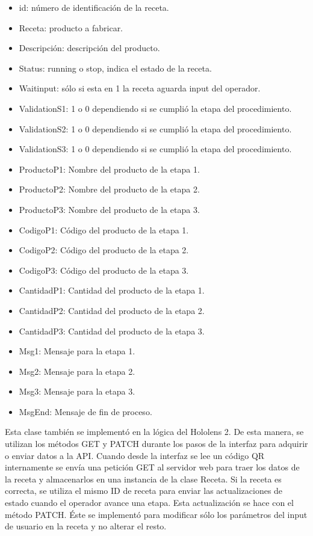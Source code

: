 \begin{itemize}
\item id: número de identificación de la receta.
\item Receta: producto a fabricar.
\item Descripción: descripción del producto.
\item Status: running o stop, indica el estado de la receta.
\item Waitinput: sólo si esta en 1 la receta aguarda input del operador.
\item ValidationS1: 1 o 0 dependiendo si se cumplió la etapa del procedimiento.
\item ValidationS2: 1 o 0 dependiendo si se cumplió la etapa del procedimiento.
\item ValidationS3: 1 o 0 dependiendo si se cumplió la etapa del procedimiento.
\item ProductoP1: Nombre del producto de la etapa 1.
\item ProductoP2: Nombre del producto de la etapa 2.
\item ProductoP3: Nombre del producto de la etapa 3.
\item CodigoP1: Código del producto de la etapa 1.
\item CodigoP2: Código del producto de la etapa 2.
\item CodigoP3: Código del producto de la etapa 3.
\item CantidadP1: Cantidad del producto de la etapa 1.
\item CantidadP2: Cantidad del producto de la etapa 2.
\item CantidadP3: Cantidad del producto de la etapa 3.
\item Msg1: Mensaje para la etapa 1.
\item Msg2: Mensaje para la etapa 2.
\item Msg3: Mensaje para la etapa 3.
\item MsgEnd: Mensaje de fin de proceso.
\end{itemize}

Esta clase también se implementó en la lógica del Hololens 2. De esta manera, se utilizan los métodos GET y PATCH durante los pasos de la interfaz para adquirir o enviar datos a la API. Cuando desde la interfaz se lee un código QR internamente se envía una petición GET al servidor web para traer los datos de la receta y almacenarlos en una instancia de la clase Receta. Si la receta es correcta, se utiliza el mismo ID de receta para enviar las actualizaciones de estado cuando el operador avance una etapa. Esta actualización se hace con el método PATCH. Éste se implementó para modificar sólo los parámetros del input de usuario en la receta y no alterar el resto. 

